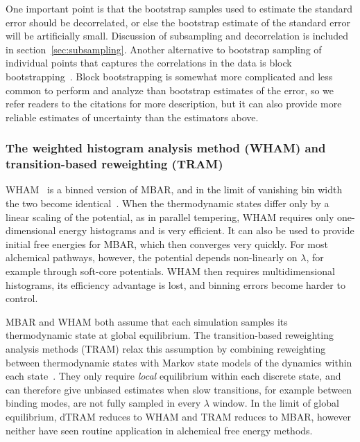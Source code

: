 One important point is that the bootstrap samples used to estimate the standard error should be decorrelated, or else the bootstrap estimate of the standard error will be artificially small. Discussion of subsampling and decorrelation is included in section~\ref{sec:subsampling}. Another alternative to bootstrap sampling of individual points that captures the correlations in the data is block bootstrapping~\cite{politis2004automatic, patton2009correction, kunsch1989jackknife}. Block bootstrapping is somewhat more complicated and less common to perform and analyze than bootstrap estimates of the error, so we refer readers to the citations for more description, but it can also provide more reliable estimates of uncertainty than the estimators above.

\subsubsection{The weighted histogram analysis method (WHAM) and transition-based reweighting (TRAM)}
WHAM~\cite{kumar1992weighted} is a binned version of MBAR, and in the limit of vanishing bin width the two become identical~\cite{shirts2008statistically}.
When the thermodynamic states differ only by a linear scaling of the potential, as in parallel tempering, WHAM requires only one-dimensional energy histograms and is very efficient.
It can also be used to provide initial free energies for MBAR, which then converges very quickly.
For most alchemical pathways, however, the potential depends non-linearly on $\lambda$, for example through soft-core potentials.
WHAM then requires multidimensional histograms, its efficiency advantage is lost, and binning errors become harder to control.

MBAR and WHAM both assume that each simulation samples its thermodynamic state at global equilibrium.
The transition-based reweighting analysis methods (TRAM) relax this assumption by combining reweighting between thermodynamic states with Markov state models of the dynamics within each state~\cite{wu2014statistically,mey2014xtram,wu2016multiensemble}.
They only require \emph{local} equilibrium within each discrete state, and can therefore give unbiased estimates when slow transitions, for example between binding modes, are not fully sampled in every $\lambda$ window.
In the limit of global equilibrium, dTRAM reduces to WHAM and TRAM reduces to MBAR, however neither have seen routine application in alchemical free energy methods. 

